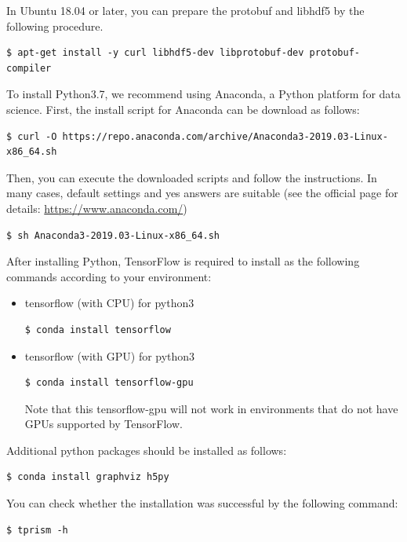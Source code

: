 \documentclass[a4paper]{report}
\begin{document}
In Ubuntu 18.04 or later, you can prepare the protobuf and libhdf5 by the following procedure.
\begin{verbatim}
$ apt-get install -y curl libhdf5-dev libprotobuf-dev protobuf-compiler 
\end{verbatim}

To install Python3.7, we recommend using Anaconda, a Python platform for data science.
First, the install script for Anaconda can be download as follows: 
\begin{verbatim}
$ curl -O https://repo.anaconda.com/archive/Anaconda3-2019.03-Linux-x86_64.sh
\end{verbatim}

Then, you can execute the downloaded scripts and follow the instructions. In many cases, default settings and yes answers are suitable (see the official page for details: \url{https://www.anaconda.com/})

\begin{verbatim}
$ sh Anaconda3-2019.03-Linux-x86_64.sh
\end{verbatim}

After installing Python, TensorFlow is required to install as the following commands according to your environment:
\begin{itemize}
	\item tensorflow (with CPU) for python3
	\begin{verbatim}
$ conda install tensorflow
	\end{verbatim}
	\item  tensorflow (with GPU) for python3
	\begin{verbatim}
$ conda install tensorflow-gpu
	\end{verbatim}
	Note that this tensorflow-gpu will not work in environments that do not have GPUs supported by TensorFlow.
\end{itemize}
Additional python packages should be installed as follows:
\begin{verbatim}
$ conda install graphviz h5py
\end{verbatim}

You can check whether the installation was successful by the following command:
\begin{verbatim}
$ tprism -h
\end{verbatim}
\end{document}
